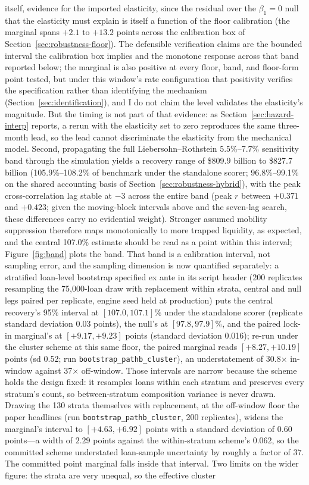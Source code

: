 \documentclass[12pt]{article}
\begin{document}
itself, evidence for the imported elasticity, since the residual over the $\beta_1 = 0$ null that the elasticity must explain is itself a function of the floor calibration (the marginal spans $+2.1$ to $+13.2$ points across the calibration box of Section~\ref{sec:robustness-floor}). The defensible verification claims are the bounded interval the calibration box implies and the monotone response across that band reported below; the marginal is also positive at every floor, band, and floor-form point tested, but under this window's rate configuration that positivity verifies the specification rather than identifying the mechanism (Section~\ref{sec:identification}), and I do not claim the level validates the elasticity's magnitude. But the timing is not part of that evidence: as Section~\ref{sec:hazard-interp} reports, a rerun with the elasticity set to zero reproduces the same three-month lead, so the lead cannot discriminate the elasticity from the mechanical model. Second, propagating the full Liebersohn--Rothstein 5.5\%--7.7\% sensitivity band through the simulation yields a recovery range of \$809.9 billion to \$827.7 billion (105.9\%--108.2\% of benchmark under the standalone scorer; 96.8\%--99.1\% on the shared accounting basis of Section~\ref{sec:robustness-hybrid}), with the peak cross-correlation lag stable at $-3$ across the entire band (peak $r$ between $+0.371$ and $+0.423$; given the moving-block intervals above and the seven-lag search, these differences carry no evidential weight). Stronger assumed mobility suppression therefore maps monotonically to more trapped liquidity, as expected, and the central 107.0\% estimate should be read as a point within this interval; Figure~\ref{fig:band} plots the band. That band is a calibration interval, not sampling error, and the sampling dimension is now quantified separately: a stratified loan-level bootstrap specified ex ante in its script header (200 replicates resampling the 75,000-loan draw with replacement within strata, central and null legs paired per replicate, engine seed held at production) puts the central recovery's 95\% interval at $[107.0, 107.1]\%$ under the standalone scorer (replicate standard deviation 0.03 points), the null's at $[97.8, 97.9]\%$, and the paired lock-in marginal's at $[+9.17, +9.23]$ points (standard deviation 0.016); re-run under the cluster scheme at this same floor, the paired marginal reads $[+8.27, +10.19]$ points (sd 0.52; run \texttt{bootstrap\_pathb\_cluster}), an understatement of 30.8$\times$ in-window against 37$\times$ off-window. Those intervals are narrow because the scheme holds the design fixed: it resamples loans within each stratum and preserves every stratum's count, so between-stratum composition variance is never drawn. Drawing the 130 strata themselves with replacement, at the off-window floor the paper headlines (run \texttt{bootstrap\_pathb\_cluster}, 200 replicates), widens the marginal's interval to $[+4.63, +6.92]$ points with a standard deviation of $0.60$ points---a width of $2.29$ points against the within-stratum scheme's $0.062$, so the committed scheme understated loan-sample uncertainty by roughly a factor of $37$. The committed point marginal falls inside that interval. Two limits on the wider figure: the strata are very unequal, so the effective cluster 
\end{document}
